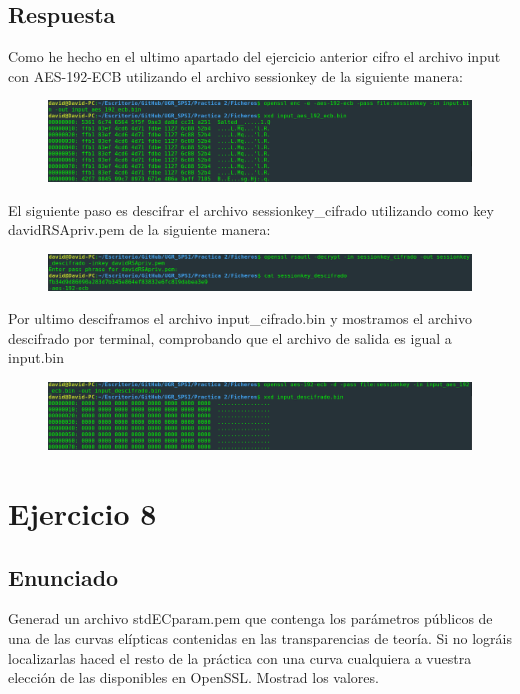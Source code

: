 \documentclass[10pt,a4paper,spanish]{report}
\begin{document}
\section{Respuesta}
\noindent
Como he hecho en el ultimo apartado del ejercicio anterior cifro el archivo input con AES-192-ECB utilizando el archivo sessionkey de la siguiente manera:

\begin{figure}[!hbp]
 \centering  \includegraphics[width=1\textwidth]{./Imagenes/6_2.png}
\end{figure}

\noindent
El siguiente paso es descifrar el archivo sessionkey\_cifrado utilizando como key davidRSApriv.pem de la siguiente manera:

\begin{figure}[!hbp]
 \centering  \includegraphics[width=1\textwidth]{./Imagenes/7_0.png}
\end{figure}

\noindent
Por ultimo desciframos el archivo input\_cifrado.bin y mostramos el archivo descifrado por terminal, comprobando que el archivo de salida es igual a input.bin

\begin{figure}[!hbp]
 \centering  \includegraphics[width=1\textwidth]{./Imagenes/7_1.png}
\end{figure}

\chapter{Ejercicio 8}

\section{Enunciado}
\noindent
Generad un archivo stdECparam.pem que contenga los parámetros públicos de una de las curvas elípticas contenidas en las transparencias de teoría. Si no lográis localizarlas haced el resto de la práctica con una curva cualquiera a vuestra elección de las disponibles en OpenSSL. Mostrad los valores.
\end{document}
